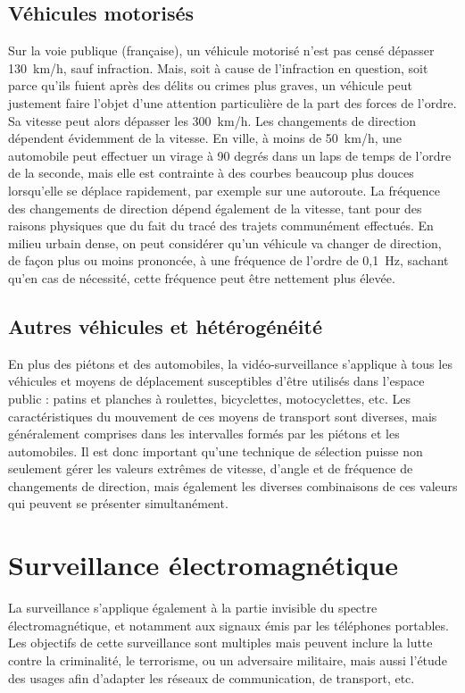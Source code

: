	\subsection{Véhicules motorisés}
	Sur la voie publique (française), un véhicule motorisé n'est pas censé dépasser 130~km/h, sauf infraction. Mais, soit à cause de l'infraction en question, soit parce qu'ils fuient après des délits ou crimes plus graves, un véhicule peut justement faire l'objet d'une attention particulière de la part des forces de l'ordre. Sa vitesse peut alors dépasser les 300~km/h.\footnotemark{} Les changements de direction dépendent évidemment de la vitesse. En ville, à moins de 50~km/h, une automobile peut effectuer un virage à 90 degrés dans un laps de temps de l'ordre de la seconde, mais elle est contrainte à des courbes beaucoup plus douces lorsqu'elle se déplace rapidement, par exemple sur une autoroute. La fréquence des changements de direction dépend également de la vitesse, tant pour des raisons physiques que du fait du tracé des trajets communément effectués. En milieu urbain dense, on peut considérer qu'un véhicule va changer de direction, de façon plus ou moins prononcée, à une fréquence de l'ordre de 0,1~Hz, sachant qu'en cas de nécessité, cette fréquence peut être nettement plus élevée.
	
	
	\subsection{Autres véhicules et hétérogénéité}
	En plus des piétons et des automobiles, la vidéo-surveillance s'applique à tous les véhicules et moyens de déplacement susceptibles d'être utilisés dans l'espace public : patins et planches à roulettes, bicyclettes, motocyclettes, etc. Les caractéristiques du mouvement de ces moyens de transport sont diverses, mais généralement comprises dans les intervalles formés par les piétons et les automobiles. Il est donc important qu'une technique de sélection puisse non seulement gérer les valeurs extrêmes de vitesse, d'angle et de fréquence de changements de direction, mais également les diverses combinaisons de ces valeurs qui peuvent se présenter simultanément.
	
	\section{Surveillance électromagnétique}
	La surveillance s'applique également à la partie invisible du spectre électromagnétique, et notamment aux signaux émis par les téléphones portables. Les objectifs de cette surveillance sont multiples mais peuvent inclure la lutte contre la criminalité, le terrorisme, ou un adversaire militaire, mais aussi l'étude des usages afin d'adapter les réseaux de communication, de transport, etc.	
	
